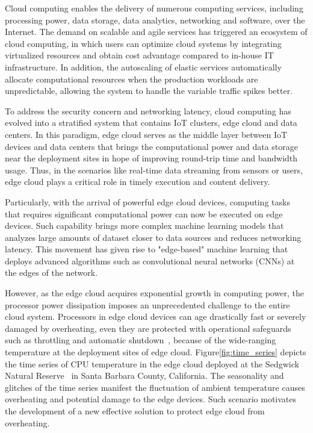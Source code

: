 Cloud computing enables the delivery of numerous computing services, including processing power, data storage, data analytics, networking and software, over the Internet. The demand on scalable and agile services has triggered an ecosystem of cloud computing, in which users can optimize cloud systems by integrating virtualized resources and obtain cost advantage compared to in-house IT infrastructure. In addition, the autoscaling of elastic services automatically allocate computational resources when the production workloads are unpredictable, allowing the system to handle the variable traffic spikes better.

To address the security concern and networking latency, cloud computing has evolved into a stratified system that contains IoT clusters, edge cloud and data centers. In this paradigm, edge cloud serves as the middle layer between IoT devices and data centers that brings the computational power and data storage near the deployment sites in hope of improving round-trip time and bandwidth usage. Thus, in the scenarios like real-time data streaming from sensors or users, edge cloud plays a critical role in timely execution and content delivery. 

Particularly, with the arrival of powerful edge cloud devices, computing tasks that requires significant computational power can now be executed on edge devices. Such capability brings more complex machine learning models that analyzes large amounts of dataset closer to data sources and reduces networking latency. This movement has given rise to "edge-based" machine learning that deploys advanced algorithms such as convolutional neural networks (CNNs) at the edges of the network.

However, as the edge cloud acquires exponential growth in computing power, the processor power dissipation imposes an unprecedented challenge to the entire cloud system. Processors in edge cloud devices can age drastically fast or severely damaged by overheating, even they are protected with operational safeguards such as throttling and automatic shutdown~\cite{ref:overheating}, because of the wide-ranging temperature at the deployment sites of edge cloud. Figure\ref{fig:time_series} depicts the time series of CPU temperature in the edge cloud deployed at the Sedgwick Natural Reserve~\cite{ref:sedgwick} in Santa Barbara County, California. The seasonality and glitches of the time series manifest the fluctuation of ambient temperature causes overheating and potential damage to the edge devices. Such scenario motivates the development of a new effective solution to protect edge cloud from overheating.

